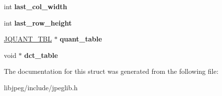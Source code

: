 \begin{DoxyCompactItemize}
\item 
\hypertarget{structjpeg__component__info_a440612272e3e9eac0a240fd34cde5bbe}{int {\bfseries last\-\_\-col\-\_\-width}}\label{structjpeg__component__info_a440612272e3e9eac0a240fd34cde5bbe}

\item 
\hypertarget{structjpeg__component__info_a7d0738ae3647a019722410a2d718f3d3}{int {\bfseries last\-\_\-row\-\_\-height}}\label{structjpeg__component__info_a7d0738ae3647a019722410a2d718f3d3}

\item 
\hypertarget{structjpeg__component__info_af3e9147532678e82ed4a54ea82f4efd5}{\hyperlink{structJQUANT__TBL}{J\-Q\-U\-A\-N\-T\-\_\-\-T\-B\-L} $\ast$ {\bfseries quant\-\_\-table}}\label{structjpeg__component__info_af3e9147532678e82ed4a54ea82f4efd5}

\item 
\hypertarget{structjpeg__component__info_af7591eef1bac561bd2912297e3f4e0ef}{void $\ast$ {\bfseries dct\-\_\-table}}\label{structjpeg__component__info_af7591eef1bac561bd2912297e3f4e0ef}

\end{DoxyCompactItemize}


The documentation for this struct was generated from the following file\-:\begin{DoxyCompactItemize}
\item 
libjpeg/include/jpeglib.\-h\end{DoxyCompactItemize}
